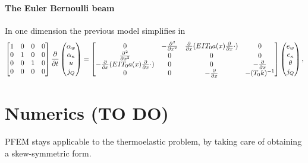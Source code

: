 \documentclass[11t]{article}
\begin{document}
\paragraph{The Euler Bernoulli beam}
In one dimension the previous model simplifies in
\begin{equation}
\begin{bmatrix}
1 & 0 & 0 & 0\\
0 & 1 & 0 & 0\\
0 & 0 & 1 & 0\\
0 & 0 & 0 & 0\\
\end{bmatrix}
\diffp{}{t}
\begin{pmatrix}
\alpha_w \\
\alpha_\kappa \\
u \\
j_Q \\
\end{pmatrix} = 
\begin{bmatrix}
0 & -\diffp[2]{}{x} & \diffp{}{x}(E I T_0 a(x) \diffp{}{x} \cdot) & 0\\
\diffp[2]{}{x} & 0 & 0 & 0 \\
- \diffp{}{x}(E I T_0 a(x) \diffp{}{x} \cdot) & 0 & 0 & - \diffp{}{x} \\
0 & 0 & - \diffp{}{x} & - (T_0 k)^{-1} \\
\end{bmatrix}
\begin{pmatrix}
e_w \\
e_\kappa \\
\theta \\
j_Q \\
\end{pmatrix},
\end{equation}

\section{Numerics (TO DO)}

PFEM stays applicable to the thermoelastic problem, by taking care of obtaining a skew-symmetric form. 




 
	
\end{document}
